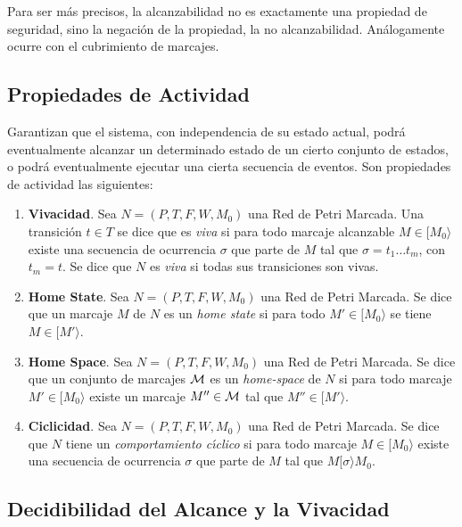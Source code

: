  Para ser m\'{a}s precisos, la alcanzabilidad no es
exactamente una propiedad de seguridad, sino la negaci\'{o}n de la propiedad,
la no alcanzabilidad. An\'{a}logamente ocurre con el cubrimiento de marcajes.

\subsection{Propiedades de Actividad}

Garantizan que el sistema, con independencia de su estado actual,
podr\'{a} eventualmente alcanzar un determinado estado de un cierto conjunto
de estados, o podr\'{a} eventualmente ejecutar una cierta secuencia de eventos.
Son propiedades de actividad las siguientes:
\begin{enumerate}
\item {\bf Vivacidad}.
Sea $N=(P,T,F,W,M_0)$ una Red de Petri Marcada. Una transici\'{o}n $t \in T$
se dice que es {\it viva} si para todo marcaje alcanzable $M \in
[ M_0 \rangle$ existe una secuencia de ocurrencia $\sigma$ que parte
de $M$ tal que $\sigma = t_1 \ldots t_m$, con $t_m = t$. Se dice que
$N$ es {\it viva} si todas sus transiciones son vivas.
\item {\bf Home State}.
Sea $N=(P,T,F,W,M_0)$ una Red de Petri Marcada. Se dice que
un marcaje $M$ de $N$ es un {\it home state} si para todo
$M' \in [ M_0 \rangle$ se tiene $M \in [ M' \rangle$.
\item {\bf Home Space}. Sea $N=(P,T,F,W,M_0)$ una Red de Petri Marcada.
Se dice que un conjunto de marcajes ${\cal M}$ es un {\it home-space}
de $N$ si para todo marcaje $M' \in [ M_0 \rangle$ existe un marcaje
$M'' \in {\cal M}$ tal que $M'' \in [ M' \rangle$.
\item {\bf Ciclicidad}.
Sea $N=(P,T,F,W,M_0)$ una Red de Petri Marcada. Se dice que
$N$ tiene un {\it comportamiento c\'{\i}clico} si para todo marcaje
$M \in [ M_0 \rangle$ existe una secuencia de ocurrencia $\sigma$
que parte de $M$ tal que $M [ \sigma \rangle M_0$.
\end{enumerate}

\subsection{Decidibilidad del Alcance y la Vivacidad}

